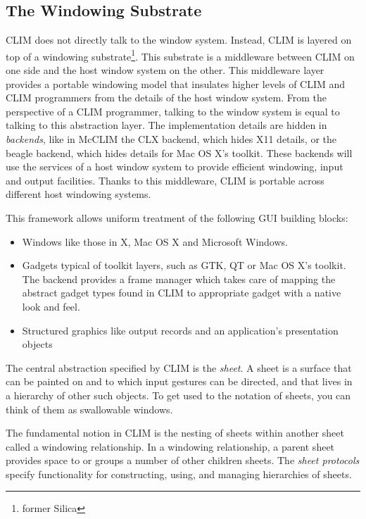\documentclass[twocolumn,a4paper]{article}
\newcommand {\concept} [1] {{\sl #1}\index{#1}}
\newcommand {\CLIM}{{\small CLIM}}
\begin{document}
\subsection{The Windowing Substrate} 

\CLIM{} does not directly talk to the window system. Instead, \CLIM{}
is layered on top of a windowing substrate\footnote{former Silica}.
This substrate is a middleware between \CLIM{} on one side and the
host window system on the other.  This middleware layer provides a
portable windowing model that insulates higher levels of \CLIM{} and
\CLIM{} programmers from the details of the host window system. From
the perspective of a \CLIM{} programmer, talking to the window system
is equal to talking to this abstraction layer. The implementation
details are hidden in \concept{backends}, like in McCLIM the CLX
backend, which hides X11 details, or the beagle backend, which hides
details for Mac OS X's toolkit. These backends will use the services
of a host window system to provide efficient windowing, input and
output facilities. Thanks to this middleware, \CLIM{} is portable
across different host windowing systems.

This framework allows uniform treatment of the following GUI building
blocks:
\begin{itemize}
\item Windows like those in X, Mac OS X and Microsoft Windows.
\item Gadgets typical of toolkit layers, such as GTK, QT or Mac OS X's
  toolkit. The backend provides a frame manager which takes care of
  mapping the abstract gadget types found in \CLIM{} to appropriate
  gadget with a native look and feel.
\item Structured graphics like output records and an application's
  presentation objects
\end{itemize}

The central abstraction specified by \CLIM{} is the \concept{sheet}. A
sheet is a surface that can be painted on and to which input gestures
can be directed, and that lives in a hierarchy of other such objects.
To get used to the notation of sheets, you can think of them as
swallowable windows.

The fundamental notion in \CLIM{} is the nesting of sheets within
another sheet called a windowing relationship. In a windowing
relationship, a parent sheet provides space to or groups a number of
other children sheets. The \concept{sheet protocols} specify
functionality for constructing, using, and managing hierarchies of
sheets.
\end{document}
